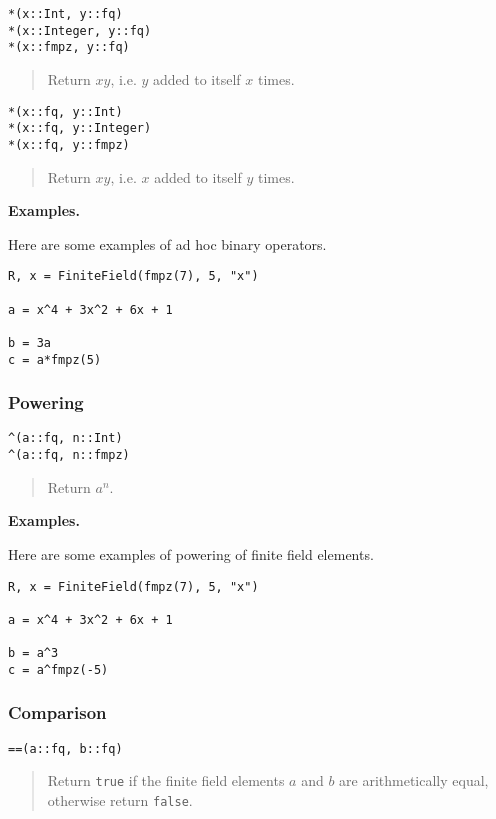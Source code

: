 \documentclass[a4paper,10pt]{article}
\newcommand{\code}{\lstinline}
\newcommand{\desc}[1]{\vspace{-3mm}\begin{quote}#1\end{quote}}
\begin{document}
{{\begin{lstlisting}
*(x::Int, y::fq)
*(x::Integer, y::fq)
*(x::fmpz, y::fq)
\end{lstlisting}

\desc{Return $xy$, i.e. $y$ added to itself $x$ times.}

\begin{lstlisting}
*(x::fq, y::Int)
*(x::fq, y::Integer)
*(x::fq, y::fmpz)
\end{lstlisting}

\desc{Return $xy$, i.e. $x$ added to itself $y$ times.}

\textbf{Examples.}

Here are some examples of ad hoc binary operators.

\begin{lstlisting}
R, x = FiniteField(fmpz(7), 5, "x")

a = x^4 + 3x^2 + 6x + 1

b = 3a
c = a*fmpz(5)
\end{lstlisting}

\subsubsection{Powering}

\begin{lstlisting}
^(a::fq, n::Int)
^(a::fq, n::fmpz)
\end{lstlisting}

\desc{Return $a^n$.}

\textbf{Examples.}

Here are some examples of powering of finite field elements.

\begin{lstlisting}
R, x = FiniteField(fmpz(7), 5, "x")

a = x^4 + 3x^2 + 6x + 1

b = a^3
c = a^fmpz(-5)
\end{lstlisting}

\subsubsection{Comparison}

\begin{lstlisting}
==(a::fq, b::fq)
\end{lstlisting}

\desc{Return \code{true} if the finite field elements $a$ and $b$ are 
arithmetically equal, otherwise return \code{false}.}

}}
\end{document}
